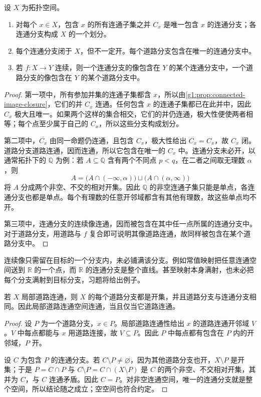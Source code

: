 \begin{proposition}\label{g1:prop:components}
	设 \(X\) 为拓扑空间。
	\begin{enumerate}
		\item 对每个 \(x\in X\)，包含 \(x\) 的所有连通子集之并 \(C_x\) 是唯一包含 \(x\) 的连通分支；各连通分支构成 \(X\) 的一个划分。
		\item 每个连通分支闭于 \(X\)，但不一定开。每个道路分支包含在唯一的连通分支中。
		\item 若 \(f:X\to Y\) 连续，则一个连通分支的像包含在 \(Y\) 的某个连通分支中，一个道路分支的像包含在 \(Y\) 的某个道路分支中。
	\end{enumerate}
\end{proposition}
\begin{proof}
	第一项中，所有参加并集的连通子集都含 \(x\)，所以由\cref{g1:prop:connected-image-closure}，它们的并 \(C_x\) 连通。任何包含 \(x\) 的连通子集都已在此并中，因此 \(C_x\) 极大且唯一。如果两个这样的集合相交，它们的并仍连通，极大性便使两者相等；每个点至少属于自己的 \(C_x\)，所以这些分支构成划分。

	第二项中，\(\overline{C_x}\) 由同一命题仍连通，且包含 \(C_x\)，极大性给出 \(\overline{C_x}=C_x\)，故 \(C_x\) 闭。道路分支道路连通，因而连通，所以它包含在唯一的 \(C_x\) 中。连通分支未必开，以通常拓扑下的 \(\mathbb Q\) 为例：若 \(A\subseteq\mathbb Q\) 含有两个不同点 \(p<q\)，在二者之间取无理数 \(\alpha\)，则
	\[
		A=\bigl(A\cap(-\infty,\alpha)\bigr)
		\sqcup\bigl(A\cap(\alpha,\infty)\bigr)
	\]
	将 \(A\) 分成两个非空、不交的相对开集。因此 \(\mathbb Q\) 的非空连通子集只能是单点，各连通分支也都是单点。每个有理数的任意开邻域都含有其他有理数，故这些单点均不开。

	第三项中，连通分支的连续像连通，因而被包含在其中任一点所属的连通分支中。对于道路分支，用道路与 \(f\) 复合即可说明其像道路连通，故同样被包含在某个道路分支中。
\end{proof}

连续像只需留在目标的一个分支内，未必铺满该分支。例如常值映射把任意连通空间送到 \(\mathbb R\) 的一个点，而 \(\mathbb R\) 的连通分支是整个直线。甚至映射本身满射，也未必把每个分支满射到目标分支，习题将给出例子。

\begin{theorem}\label{g1:thm:locally-path-components}
	若 \(X\) 局部道路连通，则 \(X\) 的每个道路分支都是开集，并且道路分支与连通分支相同。因此局部道路连通空间连通，当且仅当它道路连通。
\end{theorem}
\begin{proof}
	设 \(P\) 为一个道路分支，\(x\in P\)。局部道路连通性给出 \(x\) 的道路连通开邻域 \(V\)。\(V\) 中每点都能与 \(x\) 用道路连接，故 \(V\subseteq P\)。因此 \(P\) 中每点都有包含在 \(P\) 内的开邻域，\(P\) 开。

	设 \(C\) 为包含 \(P\) 的连通分支。若 \(C\setminus P\ne\varnothing\)，因为其他道路分支也开，\(X\setminus P\) 是开集；于是 \(P=C\cap P\) 与 \(C\setminus P=C\cap(X\setminus P)\) 是 \(C\) 的两个非空、不交相对开集，其并为 \(C\)，与 \(C\) 连通矛盾。因此 \(C=P\)。对非空连通空间，唯一的连通分支就是整个空间，所以结论随之成立；空空间也符合约定。
\end{proof}

